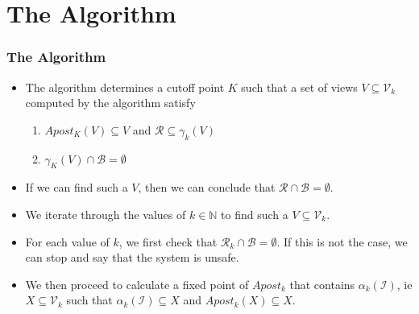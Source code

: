 \documentclass{beamer}
\begin{document}
    \section{The Algorithm}
    {
        \begin{frame}
            \frametitle{The Algorithm}
            \begin{itemize}
                \item The algorithm determines a cutoff point $K$ such that a set of views $V \subseteq \mathcal{V}_{k}$ computed by the algorithm satisfy
                \begin{enumerate}
                    \item $Apost_{K}(V) \subseteq V$ and $\mathcal{R} \subseteq \gamma_{k}(V)$
                    \item $\gamma_{K}(V) \cap \mathcal{B} = \emptyset$
                \end{enumerate}
                \item If we can find such a $V$, then we can conclude that $\mathcal{R} \cap \mathcal{B} = \emptyset$.
                \item We iterate through the values of $k \in \mathbb{N}$ to find such a $V \subseteq \mathcal{V}_{k}$.
                \item For each value of $k$, we first check that $\mathcal{R}_{k} \cap \mathcal{B} = \emptyset$. If this is not the case, we can stop and say that the system is unsafe.
                \item We then proceed to calculate a fixed point of $Apost_{k}$ that contains $\alpha_{k}(\mathcal{I})$, ie $X \subseteq \mathcal{V}_{k}$ such that $\alpha_{k}(\mathcal{I}) \subseteq X$ and $Apost_{k}(X) \subseteq X$.
            \end{itemize}
        \end{frame}
    }

            

            
            
\end{document}
